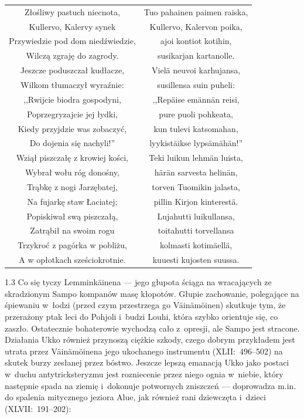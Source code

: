 \documentclass[11pt,a4paper,twoside]{report}
\begin{document}
{\centering
\small
\begin{longtable}{c c}
Złośliwy pastuch niecnota, & Tuo pahainen paimen raiska,\\
Kullervo, Kalervy synek & Kullervo, Kalervon poika,\\
Przywiedzie pod dom niedźwiedzie, & ajoi kontiot kotihin,\\
Wilczą zgraję do zagrody. & susikarjan kartanolle.\\
Jeszcze poduszczał kudłacze, & Vielä neuvoi karhujansa,\\
Wilkom tłumaczył wyraźnie: & susillensa suin puheli:\\
,,Rwijcie biodra gospodyni, & ,,Repäise emännän reisi,\\
Poprzegryzajcie jej łydki, & pure puoli pohkeata,\\
Kiedy przyjdzie was zobaczyć, & kun tulevi katsomahan,\\
Do dojenia się nachyli!'' & lyykistäikse lypsämähän!''\\
Wziął piszczałę z krowiej kości, & Teki luikun lehmän luista,\\
Wybrał wołu róg donośny, & härän sarvesta helinän,\\
Trąbkę z nogi Jarzębatej, & torven Tuomikin jalasta,\\
Na fujarkę staw Łaciatej; & pillin Kirjon kinterestä.\\
Popiskiwał swą piszczałą, & Lujahutti luikullansa,\\
Zatrąbił na swoim rogu & toitahutti torvellansa\\
Trzykroć z pagórka w pobliżu, & kolmasti kotimäellä,\\
A w opłotkach sześciokrotnie. & kuuesti kujosten suussa.\\
\end{longtable}
}
\begin{spacing}{1.3}
Co się tyczy Lemminkäinena --- jego głupota ściąga na wracających ze skradzionym Sampo kompanów masę kłopotów. Głupie zachowanie, polegające na śpiewaniu w~łodzi (przed czym przestrzega go Väinämöinen) skutkuje tym, że przerażony ptak leci do Pohjoli i~budzi Louhi, która szybko orientuje się, co zaszło. Ostatecznie bohaterowie wychodzą cało z~opresji, ale Sampo jest stracone.
Działania Ukko również przynoszą ciężkie szkody, czego dobrym przykładem jest utrata przez Väinämöinena jego ukochanego instrumentu (XLII:~496--502) na skutek burzy zesłanej przez bóstwo. Jeszcze lepszą emanacją Ukko jako postaci w~duchu antytricksteryzmu jest rozniecenie przez niego ognia w~niebie, który następnie spada na ziemię i~dokonuje potwornych zniszczeń --- doprowadza m.in. do spalenia mitycznego jeziora Alue, jak również rani dziewczęta i~dzieci (XLVII:~191--202):
\end{spacing}
\end{document}
